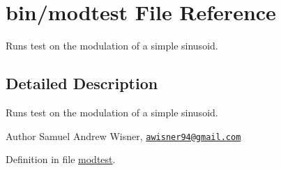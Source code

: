\hypertarget{modtest}{\section{bin/modtest File Reference}
\label{modtest}
}


Runs test on the modulation of a simple sinusoid.  




\subsection{Detailed Description}
Runs test on the modulation of a simple sinusoid. 

\begin{DoxyAuthor}{Author}
Samuel Andrew Wisner, \href{mailto:awisner94@gmail.com}{\tt awisner94@gmail.\+com} 
\end{DoxyAuthor}


Definition in file \hyperlink{modtest_source}{modtest}.

